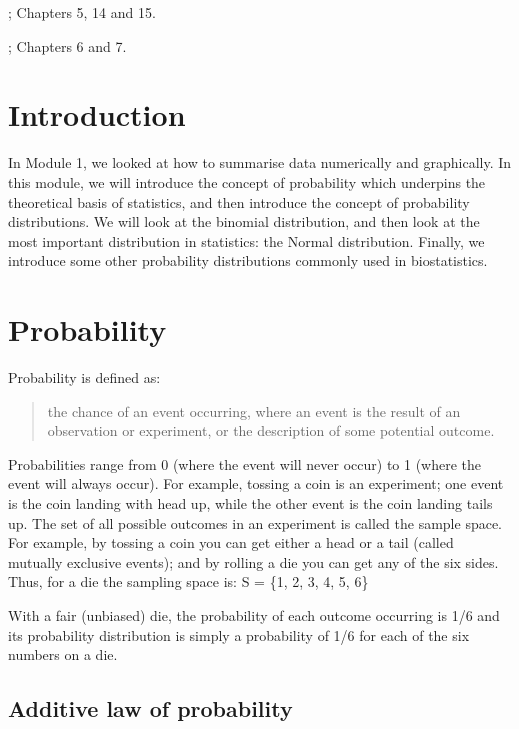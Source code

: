 \documentclass[
]{memoir}
\begin{document}
\citet{kirkwood_sterne01}; Chapters 5, 14 and 15.

\citet{bland15}; Chapters 6 and 7.

\hypertarget{introduction-1}{%
\section{Introduction}\label{introduction-1}}

In Module 1, we looked at how to summarise data numerically and graphically. In this module, we will introduce the concept of probability which underpins the theoretical basis of statistics, and then introduce the concept of probability distributions. We will look at the binomial distribution, and then look at the most important distribution in statistics: the Normal distribution. Finally, we introduce some other probability distributions commonly used in biostatistics.

\hypertarget{probability}{%
\section{Probability}\label{probability}}

Probability is defined as:

\begin{quote}
the chance of an event occurring, where an event is the result of an observation or experiment, or the description of some potential outcome.
\end{quote}

Probabilities range from 0 (where the event will never occur) to 1 (where the event will always occur). For example, tossing a coin is an experiment; one event is the coin landing with head up, while the other event is the coin landing tails up. The set of all possible outcomes in an experiment is called the sample space. For example, by tossing a coin you can get either a head or a tail (called mutually exclusive events); and by rolling a die you can get any of the six sides. Thus, for a die the sampling space is: S = \{1, 2, 3, 4, 5, 6\}

With a fair (unbiased) die, the probability of each outcome occurring is 1/6 and its probability distribution is simply a probability of 1/6 for each of the six numbers on a die.

\hypertarget{additive-law-of-probability}{%
\subsection{Additive law of probability}\label{additive-law-of-probability}}
\end{document}
